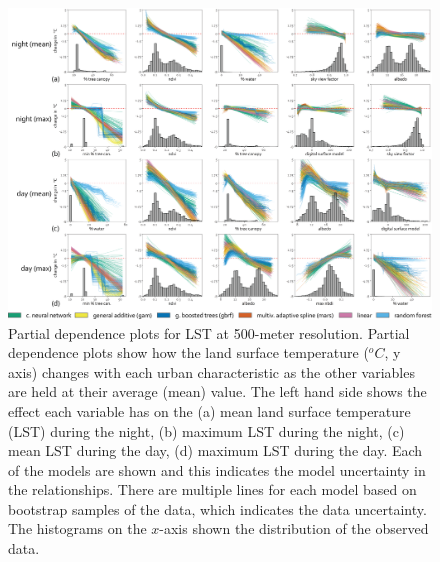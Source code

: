 \documentclass[final,3p,times,onecolumn,sort&compress]{elsarticle}
\begin{document}
\begin{figure}[h]
    \centering
    \includegraphics[width=\linewidth]{fig/report/pdp_500.png}
    \caption[Partial dependence plots for LST at 500-meter resolution]{
    Partial dependence plots for LST at 500-meter resolution.
    Partial dependence plots show how the land surface temperature ($^oC$, y axis) changes with each urban characteristic as the other variables are held at their average (mean) value. 
    The left hand side shows the effect each variable has on the (a) mean land surface temperature (LST) during the night, (b) maximum LST during the night, (c) mean LST during the day, (d) maximum LST during the day. 
    Each of the models are shown and this indicates the model uncertainty in the relationships.
    There are multiple lines for each model based on bootstrap samples of the data, which indicates the data uncertainty.
    The histograms on the $x$-axis shown the distribution of the observed data.
    }
    \label{fig:pdp_500}
\end{figure}
\end{document}
